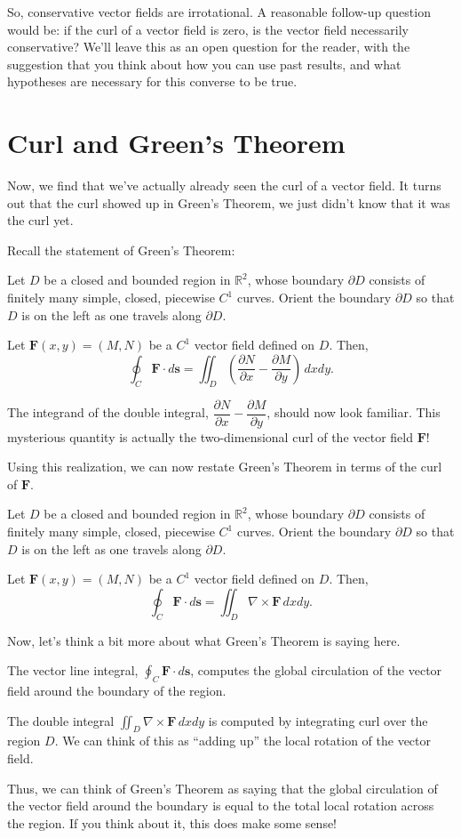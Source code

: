 \documentclass{ximera}
\begin{document}
So, conservative vector fields are irrotational. A reasonable follow-up question would be: if the curl of a vector field is zero, is the vector field necessarily conservative? We'll leave this as an open question for the reader, with the suggestion that you think about how you can use past results, and what hypotheses are necessary for this converse to be true.


\section*{Curl and Green's Theorem}

Now, we find that we've actually already seen the curl of a vector field. It turns out that the curl showed up in Green's Theorem, we just didn't know that it was the curl yet.

Recall the statement of Green's Theorem:

\begin{theorem}
Let $D$ be a closed and bounded region in $\mathbb{R}^2$, whose boundary $\partial D$ consists of finitely many simple, closed, piecewise $C^1$ curves. Orient the boundary $\partial D$ so that $D$ is on the left as one travels along $\partial D$.

Let $\mathbf{F}(x,y)=(M,N)$ be a $C^1$ vector field defined on $D$. Then,
\[
\oint_C\mathbf{F}\cdot d\mathbf{s} = \iint_D\left(\dfrac{\partial N}{\partial x}-\dfrac{\partial M}{\partial y}\right)\,dxdy.
\]
\end{theorem}

The integrand of the double integral, $\dfrac{\partial N}{\partial x}-\dfrac{\partial M}{\partial y}$, should now look familiar. This mysterious quantity is actually the two-dimensional curl of the vector field $\mathbf{F}$!

Using this realization, we can now restate Green's Theorem in terms of the curl of $\mathbf{F}$.

\begin{theorem}
Let $D$ be a closed and bounded region in $\mathbb{R}^2$, whose boundary $\partial D$ consists of finitely many simple, closed, piecewise $C^1$ curves. Orient the boundary $\partial D$ so that $D$ is on the left as one travels along $\partial D$.

Let $\mathbf{F}(x,y)=(M,N)$ be a $C^1$ vector field defined on $D$. Then,
\[
\oint_C\mathbf{F}\cdot d\mathbf{s} = \iint_D\nabla\times\mathbf{F}\,dxdy.
\]
\end{theorem}

Now, let's think a bit more about what Green's Theorem is saying here.

The vector line integral, $\oint_C\mathbf{F}\cdot d\mathbf{s}$, computes the global circulation of the vector field around the boundary of the region.

The double integral $\iint_D\nabla\times\mathbf{F}\,dxdy$ is computed by integrating curl over the region $D$. We can think of this as ``adding up'' the local rotation of the vector field.

Thus, we can think of Green's Theorem as saying that the global circulation of the vector field around the boundary is equal to the total local rotation across the region. If you think about it, this does make some sense!
\end{document}
